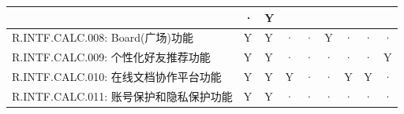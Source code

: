 \begin{table}[htbp]
\begin{tabular}{|p{9em}|p{2.5em}|p{2.5em}|p{2.5em}|p{2.5em}|p{2.5em}|
                            p{2.5em}|p{2.5em}|p{2.5em}|}
                & ·                     & Y                 \\
            \hline %
            R.INTF.CALC.008: Board(广场)功能
                & Y                     & Y                 & · 
                & ·                     & Y                 & · 
                & ·                     & ·                 \\
            \hline %
            R.INTF.CALC.009: 个性化好友推荐功能
                & Y                     & Y                 & · 
                & ·                     & ·                 & · 
                & ·                     & Y                 \\
            \hline %
            R.INTF.CALC.010: 在线文档协作平台功能
                & Y                     & Y                 & Y 
                & ·                     & ·                 & Y 
                & Y                     & ·                 \\
            \hline %
            R.INTF.CALC.011: 账号保护和隐私保护功能
                & Y                     & Y                 & · 
                & ·                     & ·                 & · 
                & ·                     & ·                 \\

\end{tabular}
\end{table}
